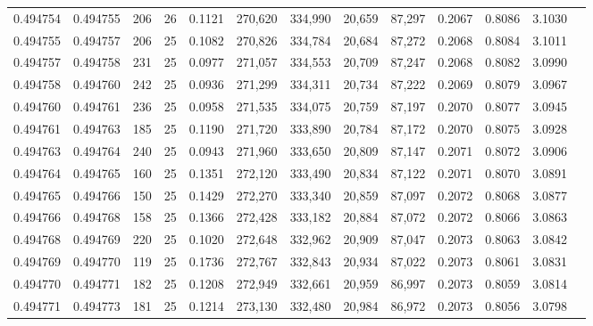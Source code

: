 \begin{tabular}{rrrrrrrrrrrrr}
0.494754 & 0.494755 &   206 &  26 &                                     0.1121 & 270,620 & 334,990 &  20,659 &  87,297 & 0.2067 & 0.8086 & 3.1030 \\
0.494755 & 0.494757 &   206 &  25 &                                     0.1082 & 270,826 & 334,784 &  20,684 &  87,272 & 0.2068 & 0.8084 & 3.1011 \\
0.494757 & 0.494758 &   231 &  25 &                                     0.0977 & 271,057 & 334,553 &  20,709 &  87,247 & 0.2068 & 0.8082 & 3.0990 \\
0.494758 & 0.494760 &   242 &  25 &                                     0.0936 & 271,299 & 334,311 &  20,734 &  87,222 & 0.2069 & 0.8079 & 3.0967 \\
0.494760 & 0.494761 &   236 &  25 &                                     0.0958 & 271,535 & 334,075 &  20,759 &  87,197 & 0.2070 & 0.8077 & 3.0945 \\
0.494761 & 0.494763 &   185 &  25 &                                     0.1190 & 271,720 & 333,890 &  20,784 &  87,172 & 0.2070 & 0.8075 & 3.0928 \\
0.494763 & 0.494764 &   240 &  25 &                                     0.0943 & 271,960 & 333,650 &  20,809 &  87,147 & 0.2071 & 0.8072 & 3.0906 \\
0.494764 & 0.494765 &   160 &  25 &                                     0.1351 & 272,120 & 333,490 &  20,834 &  87,122 & 0.2071 & 0.8070 & 3.0891 \\
0.494765 & 0.494766 &   150 &  25 &                                     0.1429 & 272,270 & 333,340 &  20,859 &  87,097 & 0.2072 & 0.8068 & 3.0877 \\
0.494766 & 0.494768 &   158 &  25 &                                     0.1366 & 272,428 & 333,182 &  20,884 &  87,072 & 0.2072 & 0.8066 & 3.0863 \\
0.494768 & 0.494769 &   220 &  25 &                                     0.1020 & 272,648 & 332,962 &  20,909 &  87,047 & 0.2073 & 0.8063 & 3.0842 \\
0.494769 & 0.494770 &   119 &  25 &                                     0.1736 & 272,767 & 332,843 &  20,934 &  87,022 & 0.2073 & 0.8061 & 3.0831 \\
0.494770 & 0.494771 &   182 &  25 &                                     0.1208 & 272,949 & 332,661 &  20,959 &  86,997 & 0.2073 & 0.8059 & 3.0814 \\
0.494771 & 0.494773 &   181 &  25 &                                     0.1214 & 273,130 & 332,480 &  20,984 &  86,972 & 0.2073 & 0.8056 & 3.0798 \\

\end{tabular}
